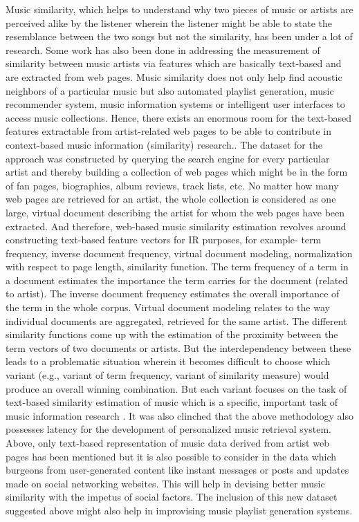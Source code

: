 \documentclass{proc}
\begin{document}
Music similarity, which helps to understand why two pieces of music or artists are perceived alike by the listener wherein the listener might be able to state the resemblance between the two songs but not the similarity, has been under a lot of research. Some work has also been done in addressing the measurement of similarity between music artists via features which are basically text-based  and are extracted from web pages. Music similarity does not only help find acoustic neighbors of a particular music but also automated playlist generation, music recommender system, music information systems or intelligent user interfaces to access music collections. Hence, there exists an enormous room for the text-based features extractable from artist-related web pages to be able to contribute in context-based music information (similarity) research.. The dataset for the approach was constructed by querying the search engine for every particular artist and thereby building a collection of web pages which might be in the form of fan pages, biographies, album reviews, track lists, etc. No matter how many web pages are retrieved for an artist, the whole collection is considered as one large, virtual document describing the artist for whom the web pages have been extracted. And therefore, web-based music similarity estimation revolves around constructing text-based feature vectors for IR purposes, for example- term frequency, inverse document frequency, virtual document modeling, normalization with respect to page length, similarity function. The term frequency of a term in a document estimates the importance the term carries for the document (related to artist). The inverse document frequency estimates the overall importance of the term in the whole corpus. Virtual document modeling relates to the way individual documents are aggregated, retrieved for the same artist. The different similarity functions come up with the estimation of the proximity between the term vectors of two documents or artists. But the interdependency between these leads to a problematic situation wherein it becomes difficult to choose which variant (e.g., variant of term frequency, variant of similarity measure) would produce an overall winning combination. But each variant focuses on the task of text-based similarity estimation of music which is a specific, important task of music information research \cite{Schedl2011}. It was also clinched that the above methodology also possesses latency for the development of personalized music retrieval system. Above, only text-based representation of music data derived from artist web pages has been mentioned but it is also possible to consider in the data which burgeons from user-generated content like instant messages or posts and updates made on social networking websites. This will help in devising better music similarity with the impetus of social factors. The inclusion of this new dataset suggested above might also help in improvising music playlist generation systems. \par
\end{document}

